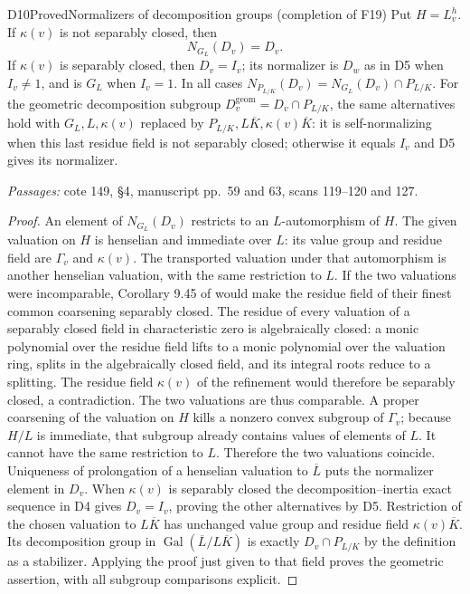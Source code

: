 \begin{result}{D10}{Proved}{Normalizers of decomposition groups (completion of F19)}
Put $H=L_v^h$. If $\kappa(v)$ is not separably closed, then
\[
 N_{G_L}(D_v)=D_v.
\]
If $\kappa(v)$ is separably closed, then $D_v=I_v$; its normalizer is $D_w$ as in D5 when $I_v\ne1$, and is $G_L$ when $I_v=1$. In all cases $N_{P_{L/K}}(D_v)=N_{G_L}(D_v)\cap P_{L/K}$. For the geometric decomposition subgroup $D_v^{\mathrm{geom}}=D_v\cap P_{L/K}$, the same alternatives hold with $G_L,L,\kappa(v)$ replaced by $P_{L/K},L\overline K,\kappa(v)\overline K$: it is self-normalizing when this last residue field is not separably closed; otherwise it equals $I_v$ and D5 gives its normalizer.
\par\emph{Passages:} cote 149, \S4, manuscript pp.~59 and 63, scans 119--120 and 127.
\end{result}
\begin{proof}
An element of $N_{G_L}(D_v)$ restricts to an $L$-automorphism of $H$. The given valuation on $H$ is henselian and immediate over $L$: its value group and residue field are $\Gamma_v$ and $\kappa(v)$. The transported valuation under that automorphism is another henselian valuation, with the same restriction to $L$. If the two valuations were incomparable, Corollary 9.45 of \cite{DE_KuhlmannHensel} would make the residue field of their finest common coarsening separably closed. The residue of every valuation of a separably closed field in characteristic zero is algebraically closed: a monic polynomial over the residue field lifts to a monic polynomial over the valuation ring, splits in the algebraically closed field, and its integral roots reduce to a splitting. The residue field $\kappa(v)$ of the refinement would therefore be separably closed, a contradiction. The two valuations are thus comparable. A proper coarsening of the valuation on $H$ kills a nonzero convex subgroup of $\Gamma_v$; because $H/L$ is immediate, that subgroup already contains values of elements of $L$. It cannot have the same restriction to $L$. Therefore the two valuations coincide. Uniqueness of prolongation of a henselian valuation to $\overline L$ puts the normalizer element in $D_v$.
When $\kappa(v)$ is separably closed the decomposition--inertia exact sequence in D4 gives $D_v=I_v$, proving the other alternatives by D5. Restriction of the chosen valuation to $L\overline K$ has unchanged value group and residue field $\kappa(v)\overline K$. Its decomposition group in $\operatorname{Gal}(\overline L/L\overline K)$ is exactly $D_v\cap P_{L/K}$ by the definition as a stabilizer. Applying the proof just given to that field proves the geometric assertion, with all subgroup comparisons explicit.
\end{proof}

